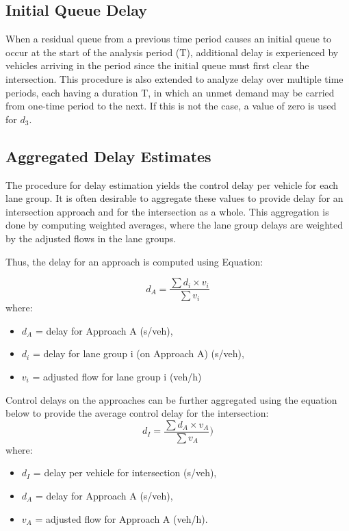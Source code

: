 \subsection{Initial Queue Delay}
When a residual queue from a previous time period causes an 
initial queue to occur at the start of the analysis period 
(T), additional delay is experienced by vehicles arriving in 
the period since the initial queue must first clear the 
intersection. This procedure is also extended to analyze 
delay over multiple time periods, each having a duration T, 
in which an unmet demand may be carried from one-time period 
to the next. If this is not the case, a value of zero is 
used for $d_3$.

\subsection{Aggregated Delay Estimates}

The procedure for delay estimation yields the control delay 
per vehicle for each lane group. It is often desirable to 
aggregate these values to provide delay for an intersection 
approach and for the intersection as a whole. This aggregation 
is done by computing weighted averages, where the lane group 
delays are weighted by the adjusted flows in the lane groups.

Thus, the delay for an approach is computed using Equation:

\begin{equation*}
    d_A=\frac{\sum d_i \times v_i}{\sum v_i}
\end{equation*}
where:
\begin{itemize}
    \item $d_A$ = delay for Approach A (s/veh), 
    \item $d_i$ = delay for lane group i (on Approach A) (s/veh),
    \item $v_i$ = adjusted flow for lane group i (veh/h)
\end{itemize}

Control delays on the approaches can be further aggregated 
using the equation below to provide the average control 
delay for the intersection:
\begin{equation*}
    d_I=\frac{\sum d_A \times v_A }{\sum v_A} )
\end{equation*}
where:
\begin{itemize}
    \item $d_I$ = delay per vehicle for intersection (s/veh), 
    \item $d_A$ = delay for Approach A (s/veh),
    \item $v_A$ = adjusted flow for Approach A (veh/h).
\end{itemize}

